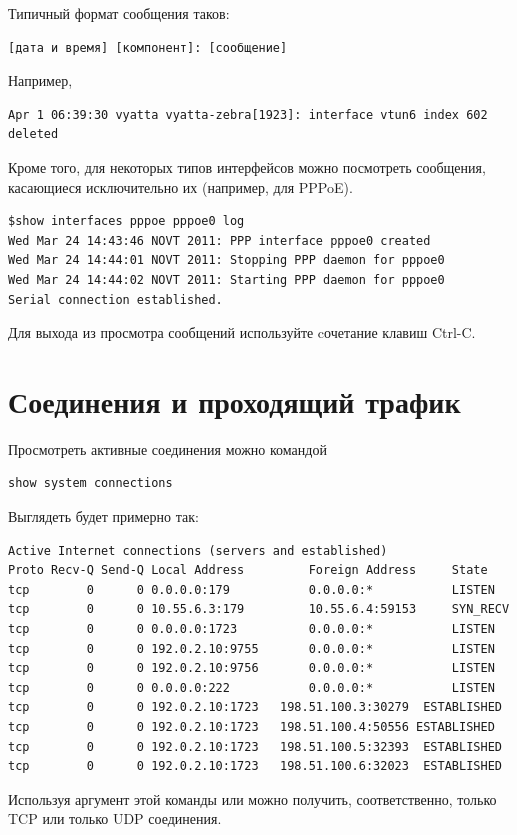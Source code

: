 \documentclass[a4paper,12pt, twoside, russian]{report}
\begin{document}
Типичный формат сообщения таков: \begin{verbatim}[дата и время] [компонент]: [сообщение]\end{verbatim}
Например,
\begin{verbatim}Apr 1 06:39:30 vyatta vyatta-zebra[1923]: interface vtun6 index 602
deleted
\end{verbatim}

Кроме того, для некоторых типов интерфейсов можно посмотреть сообщения, касающиеся исключительно их 
(например, для PPPoE).
\begin{verbatim}
$show interfaces pppoe pppoe0 log
Wed Mar 24 14:43:46 NOVT 2011: PPP interface pppoe0 created
Wed Mar 24 14:44:01 NOVT 2011: Stopping PPP daemon for pppoe0
Wed Mar 24 14:44:02 NOVT 2011: Starting PPP daemon for pppoe0
Serial connection established.
\end{verbatim}

Для выхода из просмотра сообщений используйте cочетание клавиш Ctrl-C.

\section{Соединения и проходящий трафик}

Просмотреть активные соединения можно командой \begin{verbatim}show system connections\end{verbatim}
Выглядеть будет примерно так:
\begin{verbatim}
Active Internet connections (servers and established)
Proto Recv-Q Send-Q Local Address         Foreign Address     State
tcp        0      0 0.0.0.0:179           0.0.0.0:*           LISTEN     
tcp        0      0 10.55.6.3:179         10.55.6.4:59153     SYN_RECV   
tcp        0      0 0.0.0.0:1723          0.0.0.0:*           LISTEN     
tcp        0      0 192.0.2.10:9755       0.0.0.0:*           LISTEN     
tcp        0      0 192.0.2.10:9756       0.0.0.0:*           LISTEN     
tcp        0      0 0.0.0.0:222           0.0.0.0:*           LISTEN     
tcp        0      0 192.0.2.10:1723   198.51.100.3:30279  ESTABLISHED
tcp        0      0 192.0.2.10:1723   198.51.100.4:50556 ESTABLISHED
tcp        0      0 192.0.2.10:1723   198.51.100.5:32393  ESTABLISHED
tcp        0      0 192.0.2.10:1723   198.51.100.6:32023  ESTABLISHED
\end{verbatim}

Используя аргумент этой команды  или  можно получить, соответственно, 
только TCP или только UDP соединения.
\end{document}
